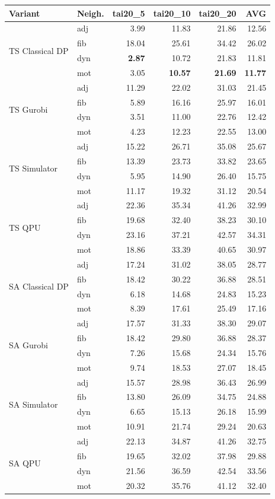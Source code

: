 \setlength{\tabcolsep}{3pt}
\begin{tabular}{@{}ll rrrr@{}}
\textbf{Variant} & \textbf{Neigh.} & tai20\_5 & tai20\_10 & tai20\_20 & \textbf{AVG} \\
\hline
\multirow{4}{*}{TS Classical DP} & adj & 3.99 & 11.83 & 21.86 & 12.56 \\
 & fib & 18.04 & 25.61 & 34.42 & 26.02 \\
 & dyn & {\bfseries 2.87} & 10.72 & 21.83 & 11.81 \\
 & mot & 3.05 & {\bfseries 10.57} & {\bfseries 21.69} & {\bfseries 11.77} \\
\hline
\multirow{4}{*}{TS Gurobi} & adj & 11.29 & 22.02 & 31.03 & 21.45 \\
 & fib & 5.89 & 16.16 & 25.97 & 16.01 \\
 & dyn & 3.51 & 11.00 & 22.76 & 12.42 \\
 & mot & 4.23 & 12.23 & 22.55 & 13.00 \\
\hline
\multirow{4}{*}{TS Simulator} & adj & 15.22 & 26.71 & 35.08 & 25.67 \\
 & fib & 13.39 & 23.73 & 33.82 & 23.65 \\
 & dyn & 5.95 & 14.90 & 26.40 & 15.75 \\
 & mot & 11.17 & 19.32 & 31.12 & 20.54 \\
\hline
\multirow{4}{*}{TS QPU} & adj & 22.36 & 35.34 & 41.26 & 32.99 \\
 & fib & 19.68 & 32.40 & 38.23 & 30.10 \\
 & dyn & 23.16 & 37.21 & 42.57 & 34.31 \\
 & mot & 18.86 & 33.39 & 40.65 & 30.97 \\
\hline
\multirow{4}{*}{SA Classical DP} & adj & 17.24 & 31.02 & 38.05 & 28.77 \\
 & fib & 18.42 & 30.22 & 36.88 & 28.51 \\
 & dyn & 6.18 & 14.68 & 24.83 & 15.23 \\
 & mot & 8.39 & 17.61 & 25.49 & 17.16 \\
\hline
\multirow{4}{*}{SA Gurobi} & adj & 17.57 & 31.33 & 38.30 & 29.07 \\
 & fib & 18.42 & 29.80 & 36.88 & 28.37 \\
 & dyn & 7.26 & 15.68 & 24.34 & 15.76 \\
 & mot & 9.74 & 18.53 & 27.07 & 18.45 \\
\hline
\multirow{4}{*}{SA Simulator} & adj & 15.57 & 28.98 & 36.43 & 26.99 \\
 & fib & 13.80 & 26.09 & 34.75 & 24.88 \\
 & dyn & 6.65 & 15.13 & 26.18 & 15.99 \\
 & mot & 10.91 & 21.74 & 29.24 & 20.63 \\
\hline
\multirow{4}{*}{SA QPU} & adj & 22.13 & 34.87 & 41.26 & 32.75 \\
 & fib & 19.65 & 32.02 & 37.98 & 29.88 \\
 & dyn & 21.56 & 36.59 & 42.54 & 33.56 \\
 & mot & 20.32 & 35.76 & 41.12 & 32.40 \\
\hline
\end{tabular}
